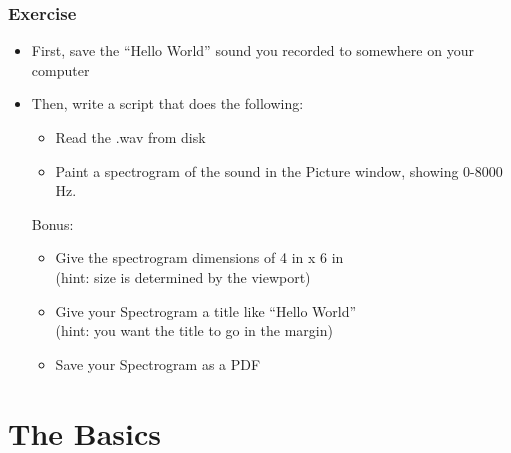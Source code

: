\documentclass[handout]{beamer}
\begin{document}
\begin{frame}[fragile]
\frametitle{Exercise}
\begin{itemize}
    \item First, save the ``Hello World'' sound you recorded to somewhere on your computer
    \item Then, write a script that does the following:
    \begin{itemize}
        \item Read the .wav from disk
        \item Paint a spectrogram of the sound in the Picture window, showing 0-8000 Hz.
    \end{itemize}
    Bonus:
    \begin{itemize}
        \item Give the spectrogram dimensions of 4 in x 6 in\\(hint: size is determined by the viewport)
        \item Give your Spectrogram a title like ``Hello World''\\(hint: you want the title to go in the margin)
        \item Save your Spectrogram as a PDF
    \end{itemize}
\end{itemize}
\end{frame}

\section{The Basics}
\end{document}
